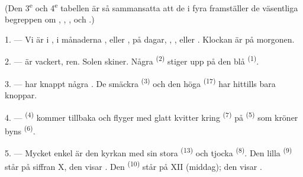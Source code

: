 
\VUsaut{3.0mm}
\VUsaut{1.6mm}
\VUsaut{3.4mm}

(Den 3\textsuperscript{e} och 4\textsuperscript{e} tabellen är så sammansatta att de i fyra
 framställer de väsentliga begreppen om
, , ,  och
.)
\VUsaut{4.0mm}

\VUsaut{3.0mm}

\VUsaut{2.4mm}

\VUsaut{3.0mm}

1. --- Vi är i , i månaderna ,  eller
, på  dagar, , ,
eller . Klockan är  på morgonen.

2. ---  är vackert,  ren. Solen skiner. Några
 \textsuperscript{(2)} stiger upp på den blå 
\textsuperscript{(1)}.

3. ---  har knappt några . De smäckra
 \textsuperscript{(3)} och den höga 
\textsuperscript{(17)} har hittills bara knoppar.

4. ---  \textsuperscript{(4)} kommer tillbaka och flyger med glatt kvitter
kring  \textsuperscript{(7)} på  \textsuperscript{(5)} som
kröner byns  \textsuperscript{(6)}.

\VUsaut{3.4mm}
\VUsaut{3.0mm}

5. --- Mycket enkel är den kyrkan med sin stora  \textsuperscript{(13)} och
tjocka  \textsuperscript{(8)}. Den lilla
 \textsuperscript{(9)} står på siffran X, den visar
. Den  \textsuperscript{(10)} står på XII
(middag); den visar .

